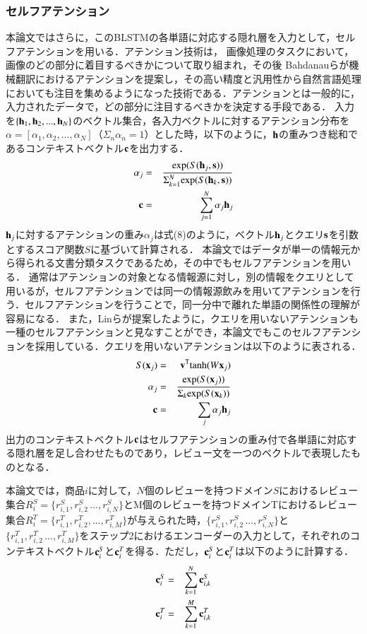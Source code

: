 \documentclass[dvipdfmx,twocolumn,10.5pt]{jsarticle}
\begin{document}
\subsubsection{セルフアテンション}
本論文ではさらに，このBLSTMの各単語に対応する隠れ層を入力として，セルフアテンションを用いる．アテンション技術は， 画像処理のタスクにおいて，画像のどの部分に着目するべきかについて取り組まれ\cite{larochelle2010learning}，その後 Bahdanauらが機械翻訳におけるアテンションを提案し\cite{bahdanau2014neural}，その高い精度と汎用性から自然言語処理においても注目を集めるようになった技術である．アテンションとは一般的に，入力されたデータで，どの部分に注目するべきかを決定する手段である．
入力を$\{ {\bf h}_1, {\bf h}_2, ..., {\bf h}_N \}$のベクトル集合，各入力ベクトルに対するアテンション分布を$\alpha = [\alpha_1, \alpha_2, ..., \alpha_N]$（$\Sigma_n \alpha_n = 1$）とした時，以下のように，${\bf h}$の重みつき総和であるコンテキストベクトル${\bf c}$を出力する．
\begin{eqnarray}
  \alpha_j &=& \frac{{\rm exp}(S({\bf h}_j, {\bf s}))}{  \Sigma_{k=1}^N {\rm exp}(S({\bf h}_k, {\bf s}))  } \\
  {\bf c} &=& \sum_{j=1}^N \alpha_j {\bf h}_j
\end{eqnarray}
${\bf h}_j$に対するアテンションの重み$\alpha_j$は式(8)のように，ベクトル${\bf h}_j$とクエリ$\bf{s}$を引数とするスコア関数$S$に基づいて計算される．
本論文ではデータが単一の情報元から得られる文書分類タスクであるため，その中でもセルフアテンションを用いる．
通常はアテンションの対象となる情報源に対し，別の情報をクエリとして用いるが，セルフアテンションでは同一の情報源飲みを用いてアテンションを行う．セルフアテンションを行うことで，同一分中で離れた単語の関係性の理解が容易になる．
また，Linらが提案したように，クエリを用いないアテンションも一種のセルフアテンションと見なすことができ\cite{lin2017structured}，本論文でもこのセルフアテンションを採用している．クエリを用いないアテンションは以下のように表される．
\begin{eqnarray}
  S({\bf x}_j) &=& {\bf v}^\mathsf{T} {\rm tanh}(W{\bf x}_j) \\
  \alpha_j &=& \frac{{\rm exp}(S({\bf x}_j))}{  \Sigma_k{\rm exp}(S({\bf x}_k))  } \\
  {\bf c} &=& \sum_j \alpha_j {\bf h}_j
\end{eqnarray}
出力のコンテキストベクトル$\bf c$はセルフアテンションの重み付で各単語に対応する隠れ層を足し合わせたものであり，レビュー文を一つのベクトルで表現したものとなる．

本論文では，商品$i$に対して，$N$個のレビューを持つドメイン$S$におけるレビュー集合$R^S_i = \{r^S_{i, 1}, r^S_{i, 2}\, ..., r^S_{i, N}\}$とM個のレビューを持つドメインTにおけるレビュー集合$R_i^T = \{ r^T_{i, 1}, r^T_{i, 2}, ..., r^T_{i, M}\}$が与えられた時，$\{r^S_{i, 1}, r^S_{i, 2}\, ..., r^S_{i, N}\}$と$\{r^T_{i, 1}, r^T_{i, 2}\, ..., r^T_{i, M}\}$をステップ2におけるエンコーダーの入力として，それぞれのコンテキストベクトル${\bf c}^S_i$と${\bf c}^T_i$を得る．ただし，${\bf c}^S_i$と${\bf c}^T_i$は以下のように計算する．
\begin{eqnarray}
 {\bf c}^S_i &=& \sum_{k=1}^N {\bf c}^S_{i, k}\\
  {\bf c}^T_i &=&  \sum_{k=1}^M {\bf c}^T_{i, k}
\end{eqnarray}
\end{document}
